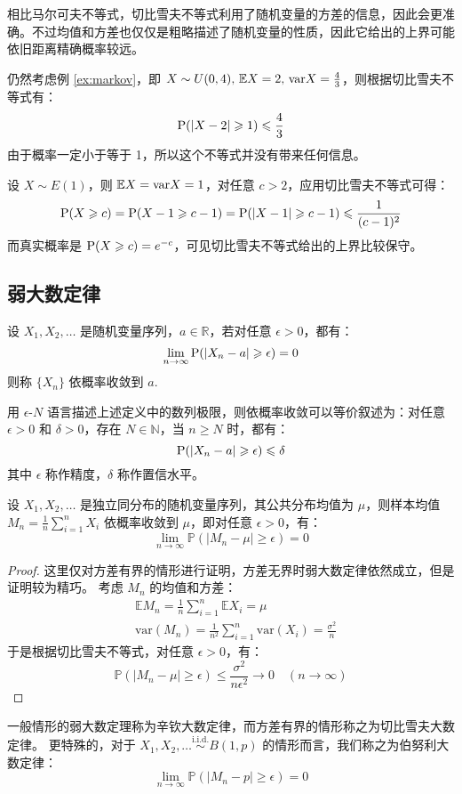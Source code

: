 相比马尔可夫不等式，切比雪夫不等式利用了随机变量的方差的信息，因此会更准确。不过均值和方差也仅仅是粗略描述了随机变量的性质，因此它给出的上界可能依旧距离精确概率较远。

\begin{example}
仍然考虑例 \ref{ex:markov}，即 $X\sim U(0,4),\,\mathbb{E} X=2,\,\mathrm{var} X=\frac{4}{3}$，则根据切比雪夫不等式有：
\[
\mathrm{P}(|X-2|\geqslant1)\leqslant\frac{4}{3}
\]
由于概率一定小于等于 1，所以这个不等式并没有带来任何信息。
\end{example}

\begin{example}
设 $X\sim E(1)$，则 $\mathbb{E} X=\mathrm{var} X=1$，对任意 $c>2$，应用切比雪夫不等式可得：
\[
\mathrm{P}(X\geqslant c)=\mathrm{P}(X-1\geqslant c-1)=\mathrm{P}(|X-1|\geqslant c-1)\leqslant\frac{1}{(c-1)^2}
\]
而真实概率是 $\mathrm{P}(X\geqslant c)=e^{-c}$，可见切比雪夫不等式给出的上界比较保守。
\end{example}


\subsection{弱大数定律}

\begin{definition}[依概率收敛]
设 $X_1,X_2,\ldots$ 是随机变量序列，$a\in\mathbb R$，若对任意 $\epsilon>0$，都有：
\[
\lim_{n\to\infty}\mathrm{P}(|X_n-a|\geqslant\epsilon)=0
\]
则称 $\{X_n\}$ 依概率收敛到 $a$.
\end{definition}

\begin{com}
用 $\epsilon$-$N$ 语言描述上述定义中的数列极限，则依概率收敛可以等价叙述为：对任意 $\epsilon>0$ 和 $\delta>0$，存在 $N\in\mathbb N$，当 $n\geq N$ 时，都有：
\[
\mathrm{P}(|X_n-a|\geqslant\epsilon)\leqslant\delta
\]
其中 $\epsilon$ 称作精度，$\delta$ 称作置信水平。
\end{com}

\begin{theorem}[弱大数定律]
设 $X_1,X_2,\ldots$ 是独立同分布的随机变量序列，其公共分布均值为 $\mu$，则样本均值 $M_n=\frac{1}{n}\sum_{i=1}^nX_i$ 依概率收敛到 $\mu$，即对任意 $\epsilon>0$，有：
\[
\lim_{n\to\infty}\mathbb P(|M_n-\mu|\geq\epsilon)=0
\]
\end{theorem}
\begin{proof}
这里仅对方差有界的情形进行证明，方差无界时弱大数定律依然成立，但是证明较为精巧。
考虑 $M_n$ 的均值和方差：
\begin{align*}
&\mathbb EM_n=\frac{1}{n}\sum_{i=1}^n\mathbb EX_i=\mu\\
&\text{var}(M_n)=\frac{1}{n^2}\sum_{i=1}^n\text{var}(X_i)=\frac{\sigma^2}{n}
\end{align*}
于是根据切比雪夫不等式，对任意 $\epsilon>0$，有：
\[
\mathbb P(|M_n-\mu|\geq\epsilon)\leq \frac{\sigma^2}{n\epsilon^2}\to0\quad(n\to\infty)
\]
\end{proof}
\begin{com}
一般情形的弱大数定理称为辛钦大数定律，而方差有界的情形称之为切比雪夫大数定律。
更特殊的，对于 $X_1,X_2,\ldots\overset{\text{i.i.d.}}{\sim}B(1,p)$ 的情形而言，我们称之为伯努利大数定律：
\[
\lim_{n\to\infty}\mathbb P(|M_n-p|\geq \epsilon)=0
\]
\end{com}


